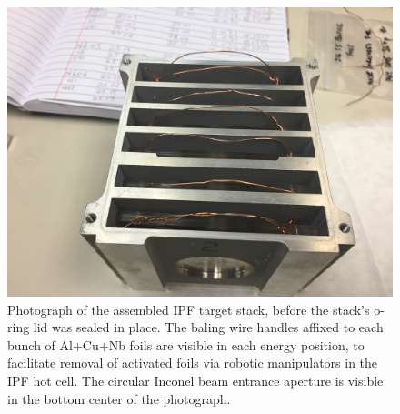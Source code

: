 \documentclass[3p]{elsarticle}
\begin{document}
\begin{figure}
 \centering
 \includegraphics[width=0.5\linewidth,clip=true,trim=13cm 0cm 3cm 6cm]{./figures/IMG_1975.JPG}
 \caption{\label{fig:target_stack}Photograph of the assembled IPF target stack, before the stack's o-ring lid was sealed in place. The baling wire handles affixed to each bunch of Al+Cu+Nb foils are visible in each energy position, to facilitate removal of activated foils via robotic manipulators in the IPF hot cell. The circular Inconel beam entrance aperture is visible in the bottom center of the photograph.  }
\end{figure}
\end{document}
